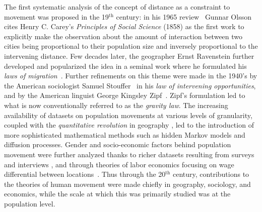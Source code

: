 The first systematic analysis of the concept of distance as a constraint to movement was proposed in the 19$^\text{th}$ century:
in his 1965 review~\cite{olsson_1965_distance} Gunnar Olsson cites Henry C. Carey's \textit{Principles of Social Science} (1858) as the first work to explicitly make the observation about the  amount of interaction between two cities being proportional to their population size and inversely proportional to the intervening distance. Few decades later, the geographer Ernst Ravenstein further developed and popularized the idea in a seminal work where he formulated his \emph{laws of migration}~\cite{ravenstein_1885_laws}. %
Further refinements on this theme were made in the 1940's by the American sociologist Samuel Stouffer~\cite{stouffer_1940_intervening, bright_1941_interstate} in his \emph{law of intervening opportunities}, and by the American linguist George Kingsley Zipf~\cite{zipf_1946_p1}.
Zipf's formulation led to what is now conventionally referred to as the \emph{gravity law}. The increasing availability of datasets on population movements at various levels of granularity, coupled with the \emph{quantitative revolution} in geography \cite{schaefer_1953_exceptionalism,berry_1993_geographys,adams_2001_quantitative}, led to the introduction of more sophisticated mathematical methods such as hidden Markov models and diffusion processes. Gender and socio-economic factors behind population movement were further analyzed thanks to richer datasets resulting from surveys and interviews \cite{ericksen_1977_analysis,hanson_1981_travel,hanson_1985_gender}, and through theories of labor economics focusing on wage differential between locations~\cite{jennissen_2007_causality}. Thus through the 20$^\text{th}$ century, contributions to the theories of human movement were made chiefly in geography, %
sociology, and economics, while the scale at which this was primarily studied was at the population level.

